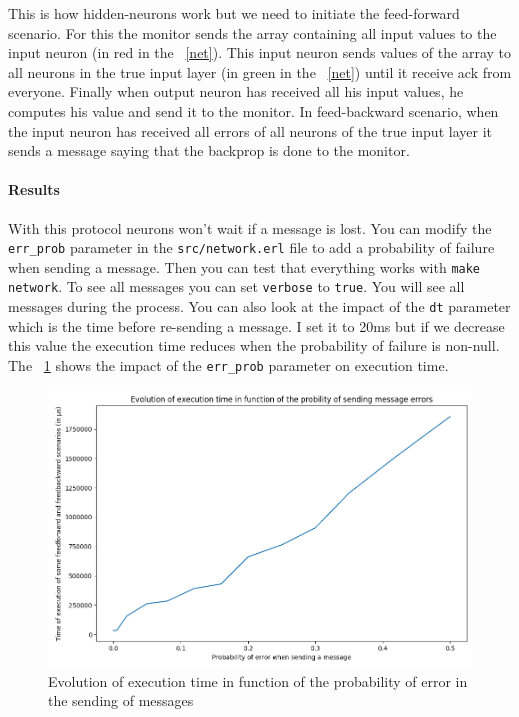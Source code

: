 \documentclass[12pt]{article}
\begin{document}
This is how hidden-neurons work but we need to initiate the feed-forward scenario. For this the monitor sends the array containing all input values to the input neuron (in red in the \figurename~\ref{net}). This input neuron sends values of the array to all neurons in the true input layer (in green in the \figurename~\ref{net}) until it receive ack from everyone. Finally when output neuron has received all his input values, he computes his value and send it to the monitor. In feed-backward scenario, when the input neuron has received all errors of all neurons of the true input layer it sends a message saying that the backprop is done to the monitor.

\paragraph{Results} With this protocol neurons won't wait if a message is lost. You can modify the \verb|err_prob| parameter in the \verb|src/network.erl| file to add a probability of failure when sending a message. Then you can test that everything works with \verb|make network|. To see all messages you can set \verb|verbose| to \verb|true|. You will see all messages during the process. You can also look at the impact of the \verb|dt| parameter which is the time before re-sending a message. I set it to 20ms but if we decrease this value the execution time reduces when the probability of failure is non-null. The \figurename~\ref{err_prob} shows the impact of the \verb|err_prob| parameter on execution time.

\begin{figure}
	\centering
	\includegraphics[scale=0.6]{prob_error.png}
	\captionsetup{justification=centering}
	\caption{Evolution of execution time in function of the probability of error in the sending of messages}
	\label{err_prob}
\end{figure}
\end{document}
